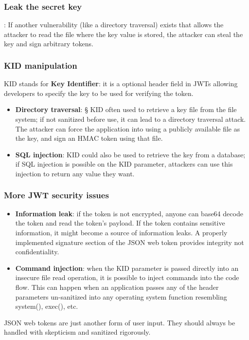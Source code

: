 \documentclass[a4paper, 10pt, titlepage]{article}
\begin{document}
\subsubsection*{Leak the secret key}: If another vulnerability (like a directory traversal) exists that allows the attacker to read the file where the key value is stored, the attacker can steal the key and sign arbitrary tokens.

\subsubsection*{KID manipulation}
KID stands for \textbf{Key Identifier}: it is a optional header field in JWTs allowing developers to specify the key to be used for verifying the token.
\begin{itemize}
\item \textbf{Directory traversal}: 
§ KID often used to retrieve a key file from the file system; if not sanitized before use, it can lead to a directory traversal attack. The attacker can force the application into using a publicly available file as the key, and sign an HMAC token using that file.
\item \textbf{SQL injection}: KID could also be used to retrieve the key from a database; if SQL injection is possible on the KID parameter, attackers can use this injection to return any value they want.
\end{itemize}

\subsubsection{More JWT security issues}
\begin{itemize}
\item \textbf{Information leak}: if the token is not encrypted, anyone can base64 decode the token and read the token’s payload. If the token contains sensitive information, it might become a source of information leaks. A properly implemented signature section of the JSON web token provides integrity not confidentiality.
\item \textbf{Command injection}: when the KID parameter is passed directly into an insecure file read operation, it is possible to inject commands into the code flow. This can happen when an application passes any of the header parameters un-sanitized into any operating system function resembling system(), exec(), etc.
\end{itemize}
JSON web tokens are just another form of user input. They should always be handled with skepticism and sanitized rigorously.
\end{document}
